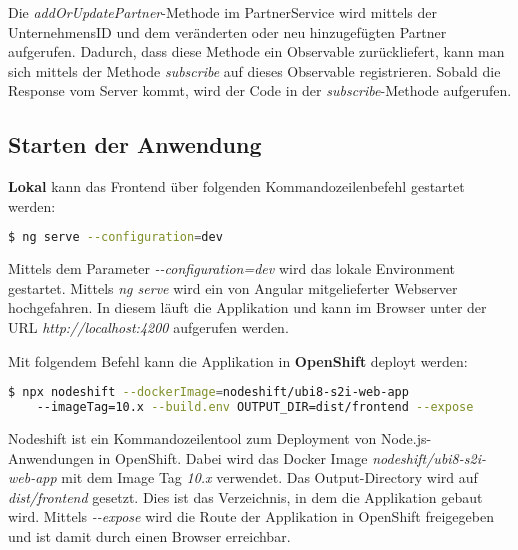 Die \textit{addOrUpdatePartner}-Methode im PartnerService wird mittels der UnternehmensID und dem veränderten oder neu hinzugefügten Partner aufgerufen. Dadurch, dass diese Methode ein Observable zurückliefert, kann man sich mittels der Methode \textit{subscribe} auf dieses Observable registrieren. Sobald die Response vom Server kommt, wird der Code in der \textit{subscribe}-Methode aufgerufen.

\subsection{Starten der Anwendung}
\textbf{Lokal} kann das Frontend über folgenden Kommandozeilenbefehl gestartet werden:
\begin{lstlisting}[language=bash]
$ ng serve --configuration=dev
\end{lstlisting}

Mittels dem Parameter \textit{-{}-configuration=dev} wird das lokale Environment gestartet. Mittels \textit{ng serve} wird ein von Angular mitgelieferter Webserver hochgefahren. In diesem läuft die Applikation und kann im Browser unter der URL \textit{http://localhost:4200} aufgerufen werden.

Mit folgendem Befehl kann die Applikation in \textbf{OpenShift} deployt werden:
\begin{lstlisting}[language=bash]
$ npx nodeshift --dockerImage=nodeshift/ubi8-s2i-web-app 
	--imageTag=10.x --build.env OUTPUT_DIR=dist/frontend --expose
\end{lstlisting}

Nodeshift ist ein Kommandozeilentool zum Deployment von Node.js-Anwendungen in OpenShift. Dabei wird das Docker Image \textit{nodeshift/ubi8-s2i-web-app} mit dem Image Tag \textit{10.x} verwendet. 
Das Output-Directory wird auf \textit{dist/frontend} gesetzt. Dies ist das Verzeichnis, in dem die Applikation gebaut wird. Mittels \textit{-{}-expose} wird die Route der Applikation in OpenShift freigegeben und ist damit durch einen Browser erreichbar.